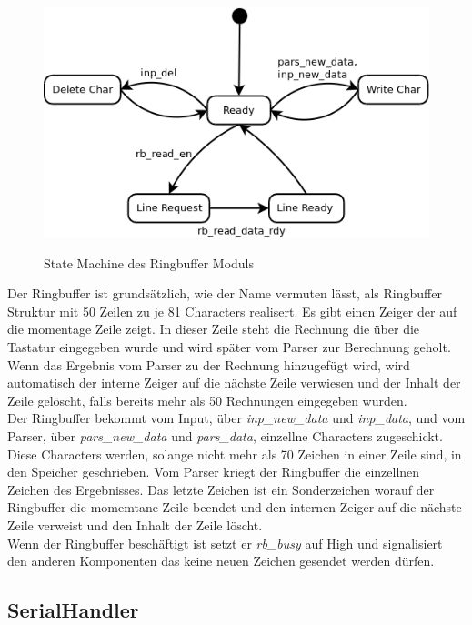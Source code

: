\begin{figure}[!ht]
 \caption{State Machine des Ringbuffer Moduls}
 \centering
 \includegraphics[scale=0.5]{pics/Ringbuffer.png}
 \label{fig:Modules}
\end{figure}

Der Ringbuffer ist grundsätzlich, wie der Name vermuten lässt, als Ringbuffer Struktur mit 50 Zeilen
zu je 81 Characters realisert. Es gibt einen Zeiger der auf die momentage Zeile zeigt. In dieser Zeile
steht die Rechnung die über die Tastatur eingegeben wurde und wird später vom Parser zur Berechnung
geholt. Wenn das Ergebnis vom Parser zu der Rechnung hinzugefügt wird, wird automatisch der interne Zeiger
auf die nächste Zeile verwiesen und der Inhalt der Zeile gelöscht, falls bereits mehr als 50 Rechnungen
eingegeben wurden.\\
Der Ringbuffer bekommt vom Input, über \textit{inp\_new\_data} und \textit{inp\_data}, und vom Parser, 
über \textit{pars\_new\_data} und \textit{pars\_data}, einzellne Characters zugeschickt.\\
Diese Characters werden, solange nicht mehr als 70 Zeichen in einer Zeile sind, in den Speicher geschrieben.
Vom Parser kriegt der Ringbuffer die einzellnen Zeichen des Ergebnisses. Das letzte Zeichen ist ein
Sonderzeichen worauf der Ringbuffer die momemtane Zeile beendet und den internen Zeiger auf die nächste
Zeile verweist und den Inhalt der Zeile löscht.\\
Wenn der Ringbuffer beschäftigt ist setzt er \textit{rb\_busy} auf High und signalisiert den anderen
Komponenten das keine neuen Zeichen gesendet werden dürfen.

\subsection{SerialHandler}

